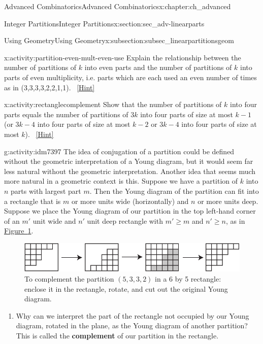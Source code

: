 \documentclass[oneside,10pt,]{book}
\newcommand{\terminology}[1]{\textbf{#1}}
\numberwithin{equation}{chapter}
\begin{document}
\begin{chapterptx}{Advanced Combinatorics}{}{Advanced Combinatorics}{}{}{x:chapter:ch_advanced}
\begin{sectionptx}{Integer Partitions}{}{Integer Partitions}{}{}{x:section:sec_adv-linearparts}
\begin{subsectionptx}{Using Geometry}{}{Using Geometry}{}{}{x:subsection:subsec_linearpartitionsgeom}
\begin{introduction}{}
\begin{activity}{}{x:activity:partition-even-mult-even-use}%
Explain the relationship between the number of partitions of \(k\) into even parts and the number of partitions of \(k\) into parts of even multiplicity, i.e. parts which are each used an even number of times as in (3,3,3,3,2,2,1,1).%
\qquad~\hfill{\tiny\hyperlink{g:hint:idm7365-back}{[Hint]}}\end{activity}
\begin{activity}{}{x:activity:rectanglecomplement}%
Show that the number of partitions of \(k\) into four parts equals the number of partitions of \(3k\) into four parts of size at most \(k-1\) (or \(3k-4\) into four parts of size at most \(k-2\) or \(3k-4\) into four parts of size at most \(k\)).%
\qquad~\hfill{\tiny\hyperlink{g:hint:idm7381-back}{[Hint]}}\end{activity}
\begin{activity}{}{g:activity:idm7397}%
The idea of conjugation of a partition could be defined without the geometric interpretation of a Young diagram, but it would seem far less natural without the geometric interpretation. Another idea that seems much more natural in a geometric context is this. Suppose we have a partition of \(k\) into \(n\) parts with largest part \(m\). Then the Young diagram of the partition can fit into a rectangle that is \(m\) or more units wide (horizontally) and \(n\) or more units deep. Suppose we place the Young diagram of our partition in the top left-hand corner of an \(m'\) unit wide and \(n'\) unit deep rectangle with \(m'\ge m\) and \(n' \ge n\), as in \hyperref[x:figure:complementpartition]{Figure~\ref{x:figure:complementpartition}}.%
\begin{figure}
\centering
\includegraphics[width=0.7\linewidth]{images/complementpartition}
\caption{To complement the partition \((5,3,3,2)\) in a 6 by 5 rectangle: enclose it in the rectangle, rotate, and cut out the original Young diagram.\label{x:figure:complementpartition}}
\end{figure}
\begin{enumerate}[font=\bfseries,label=(\alph*),ref=\alph*]
\item{}Why can we interpret the part of the rectangle not occupied by our Young diagram, rotated in the plane, as the Young diagram of another partition? This is called the \terminology{complement} of our partition in the rectangle.%

\end{enumerate}
\end{activity}
\end{introduction}
\end{subsectionptx}
\end{sectionptx}
\end{chapterptx}
\end{document}
